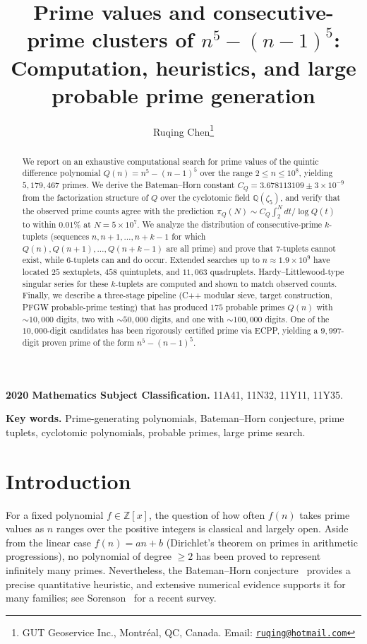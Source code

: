 \documentclass[11pt,a4paper]{article}
\title{Prime values and consecutive-prime clusters of \texorpdfstring{$n^5-(n-1)^5$}{n\^{}5-(n-1)\^{}5}: \\[4pt] Computation, heuristics, and large probable prime generation}
\author{Ruqing Chen\thanks{GUT Geoservice Inc., Montr\'eal, QC, Canada.  Email: \href{mailto:ruqing@hotmail.com}{\texttt{ruqing@hotmail.com}}}}
\date{}
\theoremstyle{plain}
\theoremstyle{definition}
\theoremstyle{remark}
\begin{document}
\maketitle

\begin{abstract}
We report on an exhaustive computational search for prime values of the quintic difference polynomial $Q(n) = n^5 - (n-1)^5$ over the range $2 \le n \le 10^8$, yielding $5{,}179{,}467$ primes.
We derive the Bateman--Horn constant $C_Q = 3.678113109 \pm 3 \times 10^{-9}$ from the factorization structure of $Q$ over the cyclotomic field $\mathbb{Q}(\zeta_5)$, and verify that the observed prime counts agree with the prediction $\pi_Q(N) \sim C_Q \int_2^N dt/\!\log Q(t)$ to within $0.01\%$ at $N = 5 \times 10^7$.
We analyze the distribution of consecutive-prime $k$-tuplets (sequences $n, n{+}1, \ldots, n{+}k{-}1$ for which $Q(n), Q(n{+}1), \ldots, Q(n{+}k{-}1)$ are all prime) and prove that $7$-tuplets cannot exist, while $6$-tuplets can and do occur.
Extended searches up to $n \approx 1.9 \times 10^9$ have located $25$ sextuplets, $458$ quintuplets, and $11{,}063$ quadruplets.
Hardy--Littlewood-type singular series for these $k$-tuplets are computed and shown to match observed counts.
Finally, we describe a three-stage pipeline (C++ modular sieve, target construction, PFGW probable-prime testing) that has produced $175$ probable primes $Q(n)$ with $\sim\! 10{,}000$ digits, two with $\sim\! 50{,}000$ digits, and one with $\sim\! 100{,}000$ digits. One of the $10{,}000$-digit candidates has been rigorously certified prime via ECPP, yielding a $9{,}997$-digit proven prime of the form $n^5-(n-1)^5$.
\end{abstract}

\bigskip
\noindent \textbf{2020 Mathematics Subject Classification.} 11A41, 11N32, 11Y11, 11Y35.

\noindent \textbf{Key words.} Prime-generating polynomials, Bateman--Horn conjecture, prime tuplets, cyclotomic polynomials, probable primes, large prime search.

\section{Introduction}
\label{sec:intro}

For a fixed polynomial $f \in \mathbb{Z}[x]$, the question of how often $f(n)$ takes prime values as $n$ ranges over the positive integers is classical and largely open. Aside from the linear case $f(n) = an + b$ (Dirichlet's theorem on primes in arithmetic progressions), no polynomial of degree $\ge 2$ has been proved to represent infinitely many primes. Nevertheless, the Bateman--Horn conjecture~\cite{bateman1962} provides a precise quantitative heuristic, and extensive numerical evidence supports it for many families; see Sorenson~\cite{sorenson2024} for a recent survey.
\end{document}
